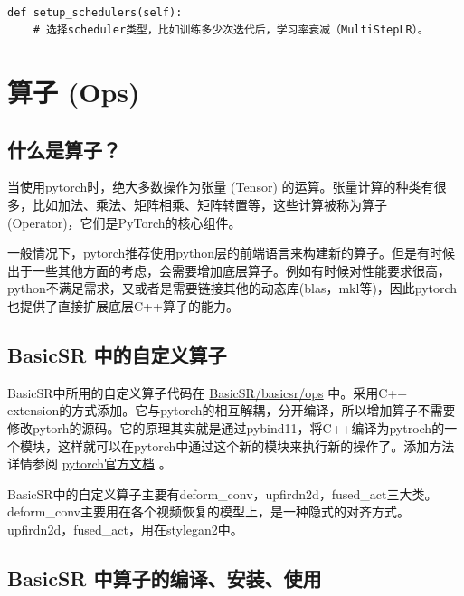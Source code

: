 \documentclass[../main.tex]{subfiles}
\begin{document}
\begin{verbatim}

def setup_schedulers(self):
    # 选择scheduler类型，比如训练多少次迭代后，学习率衰减（MultiStepLR）。
\end{verbatim}




\section{算子 (Ops)}\label{code_structure:ops}

\subsection{什么是算子？}

当使用pytorch时，绝大多数操作为张量 (Tensor) 的运算。张量计算的种类有很多，比如加法、乘法、矩阵相乘、矩阵转置等，这些计算被称为算子 (Operator)，它们是PyTorch的核心组件。

一般情况下，pytorch推荐使用python层的前端语言来构建新的算子。但是有时候出于一些其他方面的考虑，会需要增加底层算子。例如有时候对性能要求很高，python不满足需求，又或者是需要链接其他的动态库(blas，mkl等)，因此pytorch也提供了直接扩展底层C++算子的能力。

\subsection{BasicSR 中的自定义算子}

BasicSR中所用的自定义算子代码在 \href{https://github.com/XPixelGroup/BasicSR/tree/master/basicsr/ops}{BasicSR/basicsr/ops} 中。采用C++ extension的方式添加。它与pytorch的相互解耦，分开编译，所以增加算子不需要修改pytorh的源码。它的原理其实就是通过pybind11，将C++编译为pytroch的一个模块，这样就可以在pytorch中通过这个新的模块来执行新的操作了。添加方法详情参阅 \href{https://pytorch.org/tutorials/advanced/cpp_extension.html#writing-a-mixed-c-cuda-extension}{pytorch官方文档} 。

BasicSR中的自定义算子主要有deform\_conv，upfirdn2d，fused\_act三大类。deform\_conv主要用在各个视频恢复的模型上，是一种隐式的对齐方式。upfirdn2d，fused\_act，用在stylegan2中。

\subsection{BasicSR 中算子的编译、安装、使用}
\end{document}
